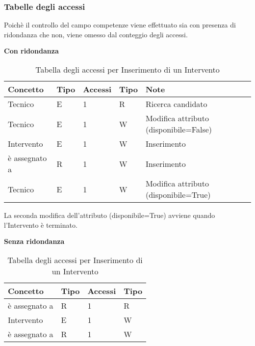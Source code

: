 \documentclass{article}
\begin{document}
\subsubsection{Tabelle degli accessi}
Poichè il controllo del campo competenze viene effettuato sia con presenza di ridondanza che non, viene omesso dal conteggio degli accessi. 

\textbf{Con ridondanza}

\begin{table}[h!]
    \centering
        \begin{adjustbox}{width=1\textwidth}
            \begin{tabular}{|m{}|m{2cm}|m{2cm}|m{2cm}|m{6cm}|}
                \hline  
                \textbf{Concetto} & \textbf{Tipo} & \textbf{Accessi} & \textbf{Tipo} & \textbf{Note}\\ 
                \hline
                Tecnico & E & 1 & R & Ricerca candidato \\
                \hline
                Tecnico & E & 1 & W & Modifica attributo (disponibile=False)\\
                \hline
                Intervento & E & 1 & W & Inserimento \\
                \hline
                è assegnato a & R & 1 & W & Inserimento \\
                \hline
                Tecnico & E & 1 & W & Modifica attributo (disponibile=True)\\
                \hline
            \end{tabular}
        \end{adjustbox}
    \caption{Tabella degli accessi per Inserimento di un Intervento}
    \label{tab:accesstable}
\end{table}

La seconda modifica dell'attributo (disponibile=True) avviene quando l'Intervento è terminato.

\textbf{Senza ridondanza}

\begin{table}[h]
    \centering
        \begin{adjustbox}{width=0.6\textwidth}
            \begin{tabular}{|m{}|m{2cm}|m{2cm}|m{2cm}|}
                \hline  
                \textbf{Concetto} & \textbf{Tipo} & \textbf{Accessi} & \textbf{Tipo} \\ 
                \hline
                è assegnato a & R & 1 & R \\
                \hline
                Intervento & E & 1 & W \\
                \hline
                è assegnato a & R & 1 & W \\
                \hline
            \end{tabular}
        \end{adjustbox}
    \caption{Tabella degli accessi per Inserimento di un Intervento}
    \label{tab:accesstable}
\end{table}
\end{document}
